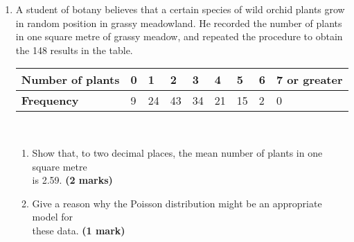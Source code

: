 \documentclass[fleqn]{article}
\begin{document}
\begin{enumerate}
    \newpage
    \item A student of botany believes that a certain species of wild orchid plants grow in random position in grassy meadowland. He recorded the number of plants in one square metre of grassy meadow, and repeated the procedure to obtain the 148 results in the table.\vspace{2mm}\\
        \begin{tabularx}{0.8\textwidth}{|X|*7{P{9mm}|}P{20mm}|}
            \hline
            \textbf{Number of plants} & 0  & 1  & 2  & 3  & 4  & 5  & 6 & 7 or greater   \\\hline
            \textbf{Frequency}        & 9  & 24 & 43 & 34 & 21 & 15 & 2 & 0              \\\hline
        \end{tabularx}\vspace{3mm}\\
        \begin{enumerate}[label=\bfseries \alph*\space ]
            \item Show that, to two decimal places, the mean number of plants in one square metre \\is 2.59. \hfill\textbf{(2 marks)}
            \item Give a reason why the Poisson distribution might be an appropriate model for\\ these data. \hfill\textbf{(1 mark)}
        \end{enumerate}
    

\end{enumerate}
\end{document}
